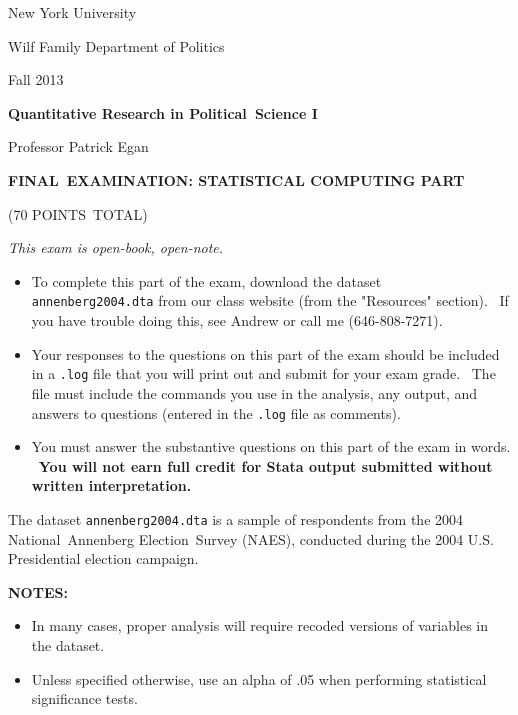 \documentclass[11pt]{article}
\begin{document}
New York University

Wilf Family Department of Politics

Fall 2013\bigskip

\begin{center}
{\large \textbf{Quantitative Research in Political\ Science I}}

Professor Patrick Egan

\bigskip
\end{center}

\bigskip

\begin{center}
\textbf{FINAL\ EXAMINATION: STATISTICAL COMPUTING PART}

(70 POINTS\ TOTAL)\textbf{\bigskip }

\textit{This exam is open-book, open-note.}
\end{center}

\bigskip

\begin{itemize}
\item To complete this part of the exam, download the dataset \texttt{%
annenberg2004.dta} from our class website (from the "Resources" section). \
If you have trouble doing this, see Andrew or call me (646-808-7271). \
\bigskip 

\item Your responses to the questions on this part of the exam should be
included in a \texttt{.log} file that you will print out and submit for your
exam grade. \ The file must include the commands you use in the analysis,
any output, and answers to questions (entered in the \texttt{.log} file as
comments).\bigskip

\item You must answer the substantive questions on this part of the exam in
words. \ \textbf{You will not earn full credit for Stata output submitted
without written interpretation.}
\end{itemize}

\newpage

\bigskip The dataset \texttt{annenberg2004.dta} is a sample of respondents
from the 2004 National\ Annenberg Election\ Survey (NAES), conducted during
the 2004 U.S. Presidential election campaign.\medskip\ \ \bigskip

\textbf{NOTES: \ }

\begin{itemize}
\item In many cases, proper analysis will require recoded versions of
variables in the dataset.

\item Unless specified otherwise, use an alpha of .05 when performing
statistical significance tests.\bigskip \bigskip
\end{itemize}
\end{document}

